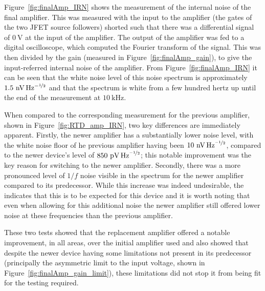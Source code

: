 \par 
Figure~\ref{fig:finalAmp_IRN} shows the measurement of the internal noise of the final amplifier. This was measured with the input to the amplifier (the gates of the two JFET source followers) shorted such that there was a differential signal of $0~\mathrm{V}$ at the input of the amplifier. The output of the amplifier was fed to a digital oscilloscope, which computed the Fourier transform of the signal. This was then divided by the gain (measured in Figure~\ref{fig:finalAmp_gain}), to give the input-referred internal noise of the amplifier. From Figure~\ref{fig:finalAmp_IRN} it can be seen that the white noise level of this noise spectrum is approximately $1.5~\mathrm{nV\,Hz}^{-\nicefrac{1}{2}}$ and that the spectrum is white from a few hundred hertz up until the end of the measurement at $10~\mathrm{kHz}$. 
\par 
When compared to the corresponding measurement for the previous amplifier, shown in Figure~\ref{fig:RTD_amp_IRN}, two key differences are immediately apparent. Firstly, the newer amplifier has a substantially lower noise level, with the white noise floor of he previous amplifier having been $10~\mathrm{nV\,Hz}^{\nicefrac{-1}{2}}$, compared to the newer device's level of $850~\mathrm{pV\,Hz}^{\nicefrac{-1}{2}}$; this notable improvement was the key reason for switching to the newer amplifier. Secondly, there was a more pronounced level of $1/f$ noise visible in the spectrum for the newer amplifier compared to its predecessor. While this increase was indeed undesirable, the \textcite{INA103DS} indicates that this is to be expected for this device and it is worth noting that even when allowing for this additional noise the newer amplifier still offered lower noise at these frequencies than the previous amplifier.
\par 
These two tests showed that the replacement amplifier offered a notable improvement, in all areas, over the initial amplifier used and also showed that despite the newer device having some limitations not present in its predecessor (principally the asymmetric limit to the input voltage, shown in Figure~\ref{fig:finalAmp_gain_limit}), these limitations did not stop it from being fit for the testing required. 
%
